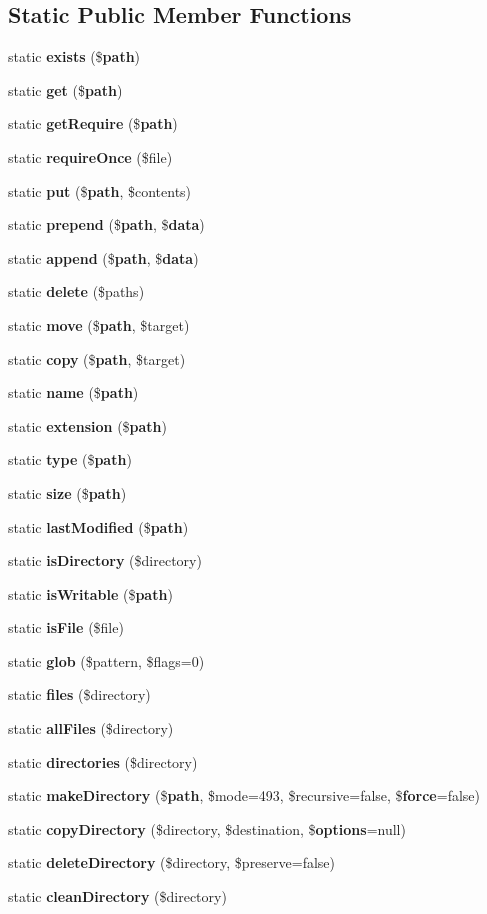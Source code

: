 \subsection*{Static Public Member Functions}
\begin{DoxyCompactItemize}
\item 
static {\bf exists} (\${\bf path})
\item 
static {\bf get} (\${\bf path})
\item 
static {\bf get\+Require} (\${\bf path})
\item 
static {\bf require\+Once} (\$file)
\item 
static {\bf put} (\${\bf path}, \$contents)
\item 
static {\bf prepend} (\${\bf path}, \${\bf data})
\item 
static {\bf append} (\${\bf path}, \${\bf data})
\item 
static {\bf delete} (\$paths)
\item 
static {\bf move} (\${\bf path}, \$target)
\item 
static {\bf copy} (\${\bf path}, \$target)
\item 
static {\bf name} (\${\bf path})
\item 
static {\bf extension} (\${\bf path})
\item 
static {\bf type} (\${\bf path})
\item 
static {\bf size} (\${\bf path})
\item 
static {\bf last\+Modified} (\${\bf path})
\item 
static {\bf is\+Directory} (\$directory)
\item 
static {\bf is\+Writable} (\${\bf path})
\item 
static {\bf is\+File} (\$file)
\item 
static {\bf glob} (\$pattern, \$flags=0)
\item 
static {\bf files} (\$directory)
\item 
static {\bf all\+Files} (\$directory)
\item 
static {\bf directories} (\$directory)
\item 
static {\bf make\+Directory} (\${\bf path}, \$mode=493, \$recursive=false, \${\bf force}=false)
\item 
static {\bf copy\+Directory} (\$directory, \$destination, \${\bf options}=null)
\item 
static {\bf delete\+Directory} (\$directory, \$preserve=false)
\item 
static {\bf clean\+Directory} (\$directory)
\end{DoxyCompactItemize}
